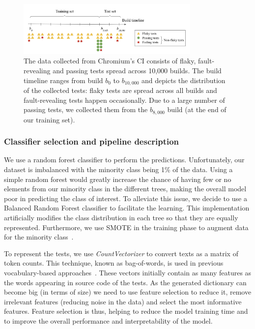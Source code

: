 \begin{figure}[t]
\centering
\includegraphics[width=0.8\textwidth]{figures/chromium/dataset.png}
\caption{The data collected from Chromium's CI consists of flaky, fault-revealing and passing tests spread across 10,000 builds. The build timeline ranges from build \textit{$b_0$} to \textit{$b_{10,000}$} and depicts the distribution of the collected tests: flaky tests are spread across all builds and fault-revealing tests happen occasionally. Due to a large number of passing tests, we collected them from the \textit{$b_{8,000}$} build (\ie at the end of our training set).}
\label{fig:dataset}
\end{figure}

\subsubsection{Classifier selection and pipeline description}
We use a random forest classifier to perform the predictions. Unfortunately, our dataset is imbalanced with the minority class being 1\% of the data. Using a simple random forest would greatly increase the chance of having few or no elements from our minority class in the different trees, making the overall model poor in predicting the class of interest. To alleviate this issue, we decide to use a Balanced Random Forest classifier\cite{chen2004using} to facilitate the learning. This implementation artificially modifies the class distribution in each tree so that they are equally represented. Furthermore, we use SMOTE in the training phase to augment data for the minority class~\cite{smote}.

To represent the tests, we use \textit{CountVectorizer} to convert texts as a matrix of token counts. This technique, known as bag-of-words, is used in previous vocabulary-based approaches~\cite{Pinto2020,Haben2021,Camara2021VocabExtendedReplication,Bertolino2020,olewickiBrown}. These vectors initially contain as many features as the words appearing in source code of the tests. As the generated dictionary can become big (in terms of size) we need to use feature selection to reduce it, remove irrelevant features (reducing noise in the data) and select the most informative features. Feature selection is thus, helping to reduce the model training time and to improve the overall performance and interpretability of the model. 

